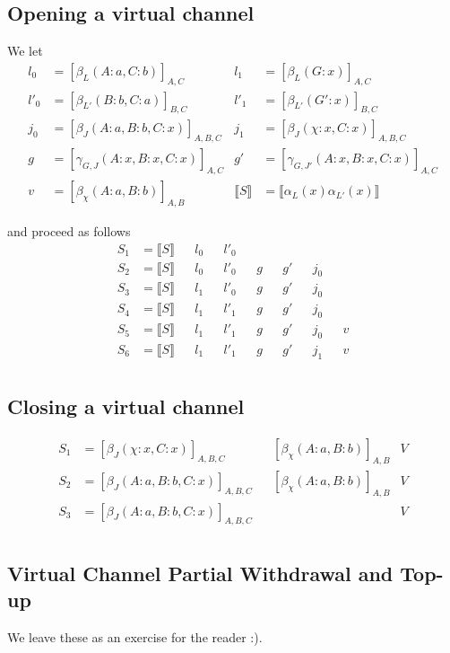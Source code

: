 \documentclass{article}
\theoremstyle{definition}
\newcommand{\adj}[1]{\llbracket #1 \rrbracket}
\newcommand{\enf}[1]{[#1]}
\begin{document}
\subsection{Opening a virtual channel}
We let
\begin{align*}
l_0 &= \enf{\beta_L(A:a, C: b)}_{A, C} &
l_1 &= \enf{\beta_L(G: x)}_{A, C} \\
l'_0 &= \enf{\beta_{L'}(B:b, C: a)}_{B, C} &
l'_1 &= \enf{\beta_{L'}(G': x)}_{B, C} \\
j_0 &= \enf{\beta_{J}(A: a, B:b, C: x)}_{A, B, C} &
j_1 &= \enf{\beta_{J}(\chi: x, C: x)}_{A, B, C} \\
g &= \enf{\gamma_{G, J}(A: x, B:x, C: x)}_{A, C} &
g' &= \enf{\gamma_{G, J'}(A: x, B:x, C: x)}_{A, C} \\
v &= \enf{\beta_\chi(A: a, B: b)}_{A, B} &
\adj{S} &= \adj{\alpha_L(x)\alpha_{L'}(x)}
\end{align*}

and proceed as follows
\begin{align*}
S_1 &= \adj{S} && l_0 && l'_0 \\
S_2 &= \adj{S} && l_0 && l'_0 && g && g' && j_0 \\
S_3 &= \adj{S} && l_1 && l'_0 && g && g' && j_0 \\
S_4 &= \adj{S} && l_1 && l'_1 && g && g' && j_0 \\
S_5 &= \adj{S} && l_1 && l'_1 && g && g' && j_0 && v\\
S_6 &= \adj{S} && l_1 && l'_1 && g && g' && j_1 && v\\
\end{align*}





\subsection{Closing a virtual channel}

\begin{align*}
S_1 &= \enf{\beta_J(\chi: x, C: x)}_{A, B, C} && \enf{\beta_\chi(A:a, B: b)}_{A, B} & V \\
S_2 &= \enf{\beta_J(A: a, B: b, C: x)}_{A, B, C} && \enf{\beta_\chi(A:a, B: b)}_{A, B} & V \\
S_3 &= \enf{\beta_J(A: a, B: b, C: x)}_{A, B, C} && & V \\
\end{align*}

\subsection{Virtual Channel Partial Withdrawal and Top-up}

We leave these as an exercise for the reader :). 
\end{document}

